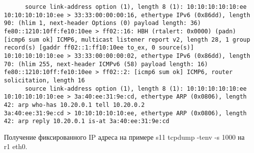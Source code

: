 \documentclass[a4paper,12pt]{article}
\begin{document}
\begin{Verbatim}
	  source link-address option (1), length 8 (1): 10:10:10:10:10:ee
10:10:10:10:10:ee > 33:33:00:00:00:16, ethertype IPv6 (0x86dd), length 90: (hlim 1, next-header Options (0) payload length: 36) fe80::1210:10ff:fe10:10ee > ff02::16: HBH (rtalert: 0x0000) (padn)[icmp6 sum ok] ICMP6, multicast listener report v2, length 28, 1 group record(s) [gaddr ff02::1:ff10:10ee to_ex, 0 source(s)]
10:10:10:10:10:ee > 33:33:00:00:00:02, ethertype IPv6 (0x86dd), length 70: (hlim 255, next-header ICMPv6 (58) payload length: 16) fe80::1210:10ff:fe10:10ee > ff02::2: [icmp6 sum ok] ICMP6, router solicitation, length 16
	  source link-address option (1), length 8 (1): 10:10:10:10:10:ee
10:10:10:10:10:ee > 3a:40:ee:31:9e:cd, ethertype ARP (0x0806), length 42: arp who-has 10.20.0.1 tell 10.20.0.2
3a:40:ee:31:9e:cd > 10:10:10:10:10:ee, ethertype ARP (0x0806), length 42: arp reply 10.20.0.1 is-at 3a:40:ee:31:9e:cd
\end{Verbatim}

Получение фиксированного IP адреса на примере s11
tcpdump -tenv -s 1000 на r1 eth0.
\end{document}
